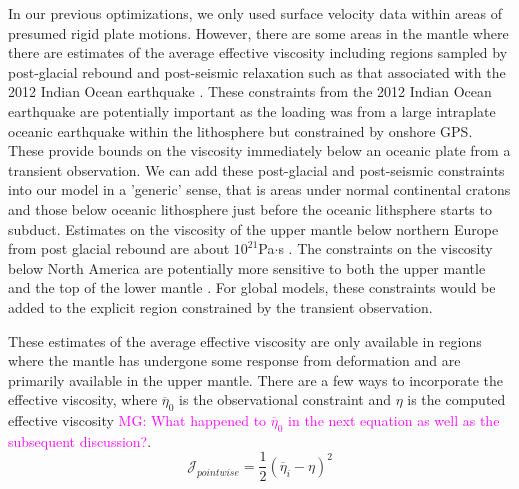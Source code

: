 \documentclass[12pt]{article}
\newcommand{\mgnote}[1]{\textcolor{magenta}{MG: #1}}
\begin{document}
In our previous optimizations, we only used surface velocity data within areas of presumed rigid plate motions. 
However, there are some areas in the mantle where there are estimates of the average effective viscosity including regions sampled by post-glacial rebound and post-seismic relaxation such as that associated with the 2012 Indian Ocean earthquake \citep{hu2016asthenosphere}.  
These constraints from the 2012 Indian Ocean earthquake are potentially important as the loading was from a large intraplate oceanic earthquake within the lithosphere but constrained by onshore GPS. These provide bounds on the viscosity immediately below an oceanic plate from a transient observation. We can add these post-glacial and post-seismic constraints into our model in a 'generic' sense, that is areas under normal continental cratons and those below oceanic lithosphere just before the oceanic lithsphere starts to subduct. Estimates on the viscosity of the upper mantle below northern Europe from post glacial rebound are about $10^{21}$Pa$\cdot$s \citep{10.2307/j.ctt13x0t47}. The constraints on the viscosity below North America are potentially more sensitive to both the upper mantle and the top of the lower mantle \citep{mitrovica1995constraints,simons1997localization}. For global models, these constraints would be added to the explicit region constrained by the transient observation.

These estimates of the average effective viscosity are only available in regions where the mantle has undergone some response from deformation and are primarily available in the upper mantle.   There are a few ways to incorporate the effective viscosity, where $\overline{\eta}_0$ is the observational constraint and $\eta$ is the computed effective viscosity \mgnote{What happened to $\overline{\eta}_0$ in the next equation as well as the subsequent discussion?}.
\begin{equation}
   \mathcal{J}_{pointwise}=  \frac{1}{2}(\overline{\eta}_i - \eta)^{2}
\label{eq:pointwise}
\end{equation}



 
\end{document}
